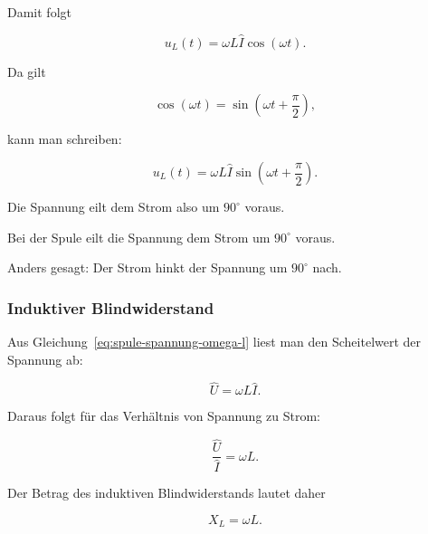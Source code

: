 Damit folgt

\begin{equation}
	u_L(t) = \omega L \hat{I} \cos(\omega t).
	\label{eq:spule-spannung-omega-l}
\end{equation}

Da gilt

\begin{equation}
	\cos(\omega t)
	=
	\sin\left(\omega t + \frac{\pi}{2}\right),
	\label{eq:cosinus-als-verschobener-sinus}
\end{equation}

kann man schreiben:

\begin{equation}
	u_L(t)
	=
	\omega L \hat{I}
	\sin\left(\omega t + \frac{\pi}{2}\right).
	\label{eq:spule-spannung-phasenverschoben}
\end{equation}

Die Spannung eilt dem Strom also um \(90^\circ\) voraus.

\begin{DidacticBox}
	\label{box:merksatz-spule-strom-hinkt-nach}
	Bei der Spule eilt die Spannung dem Strom um \(90^\circ\) voraus.
	
	Anders gesagt: Der Strom hinkt der Spannung um \(90^\circ\) nach.
\end{DidacticBox}

\subsubsection{Induktiver Blindwiderstand}
\label{subsubsec:induktiver-blindwiderstand}

Aus Gleichung~\eqref{eq:spule-spannung-omega-l} liest man den Scheitelwert
der Spannung ab:

\begin{equation}
	\hat{U} = \omega L \hat{I}.
	\label{eq:spule-scheitelwert-spannung}
\end{equation}

Daraus folgt für das Verhältnis von Spannung zu Strom:

\begin{equation}
	\frac{\hat{U}}{\hat{I}} = \omega L.
	\label{eq:spule-verhaeltnis-u-i}
\end{equation}

Der Betrag des induktiven Blindwiderstands lautet daher

\begin{equation}
	X_L = \omega L.
	\label{eq:induktiver-blindwiderstand}
\end{equation}

